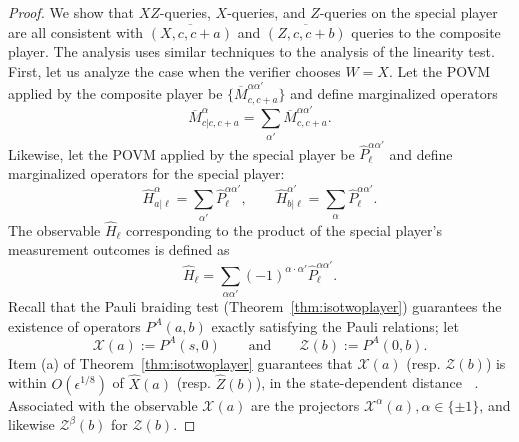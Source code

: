 \documentclass[11pt,letterpaper]{article}
\newcommand{\<}{\langle}
\renewcommand{\>}{\rangle}
\newcommand{\thmref}[1]{Theorem~\ref{thm:#1}}
\newcommand{\eps}{\epsilon}
\newcommand{\Xlin}{\mathcal{X}}
\newcommand{\Zlin}{\mathcal{Z}}
\DeclareMathOperator{\DIS}{d}
\DeclareMathOperator{\Drho}{\DIS_\rho}
\newcommand{\sx}{\hat{X}}
\newcommand{\sz}{\hat{Z}}
\renewcommand{\sp}{\hat{H}}
\begin{document}
\begin{proof}
We show that $XZ$-queries, $X$-queries, and $Z$-queries
  on the special player are all consistent with $\overline{(X, c, c + a)}$ and
  $\overline{(Z, c, c+b)}$  queries to the composite player. The analysis uses similar techniques to the analysis of the linearity test. First, let us
  analyze the case when the verifier chooses $W=X$. Let the POVM applied by the composite player
  be $\{\overline{M}_{c, c+a}^{\alpha \alpha'}\}$ and define marginalized
  operators 
  \[    \overline{M}_{c | c, c+a}^{\alpha} = \sum_{\alpha'} \overline{M}_{c,
    c+a}^{\alpha\alpha'}.\]
Likewise, let the POVM applied by the special player be
$\hat{P}_{\ell}^{\alpha \alpha'}$ and define marginalized operators for the special player: 
\[ \sp^{\alpha}_{a|\ell} = \sum_{\alpha'} \hat{P}^{\alpha \alpha'}_{\ell},
\qquad \sp^{\alpha'}_{b | \ell} = \sum_{\alpha} \hat{P}^{\alpha
  \alpha'}_{\ell}. \]
The observable $\sp_\ell$ corresponding to the product of the special player's
measurement outcomes is defined as
\[ \sp_\ell = \sum_{\alpha \alpha'} (-1)^{\alpha \cdot \alpha'}
\hat{P}^{\alpha \alpha'}_{\ell}. \]
Recall that the Pauli braiding test (\thmref{isotwoplayer})
guarantees the existence of operators $P^A(a,b)$ exactly satisfying
the Pauli relations; let
\[ \Xlin(a) := P^A(s, 0)\qquad\text{and}\qquad \Zlin(b) := P^A(0, b). \]
Item (a) of \thmref{isotwoplayer} guarantees that $\Xlin(a)$ (resp. $\Zlin(b)$) is within $O(\eps_{}^{1/8})$ of 
$\sx(a)$ (resp. $\sz(b)$), in the state-dependent distance $\Drho$. Associated with the observable $\Xlin(a)$ are the projectors
$\Xlin^\alpha(a), \alpha \in \{\pm 1\}$, and likewise $\Zlin^\beta(b)$
for $\Zlin(b)$.


\end{proof}
\end{document}
